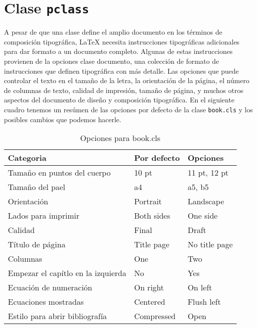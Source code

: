 	

\section{Clase \texttt{pclass}}

	
A pesar de que  una clase  define el amplio documento en los términos de composición tipográfica, \LaTeX{} necesita instrucciones tipográficas adicionales para dar formato a un documento completo. Algunas de estas instrucciones provienen de la opciones clase documento,  una colección de formato de instrucciones que definen tipográfica con más detalle. Las opciones que puede controlar el texto en el tamaño de la letra, la orientación de la página, el número de columnas de texto, calidad de impresión, tamaño de página, y muchos otros aspectos del documento de diseño y composición tipográfica. En el siguiente  cuadro tenemos un resúmen de las opciones por defecto de la clase \verb|book.cls|  y los posibles cambios que podemos hacerle.
		\begin{table}[tbh]
  		 \begin{center}
    		    \leavevmode
		    \begin{tabular}{|l|l||l|}
      		    \hline
			\textbf{Categoria} & \textbf{Por defecto} & \textbf{Opciones} \\
		    \hline
		    \hline
      			Tamaño en puntos del cuerpo & 10 pt  &  11 pt, 12 pt   \\
		    \hline
      			Tamaño del pael  & a4    & a5, b5\\
      		    \hline
      			Orientación & Portrait   &     Landscape     \\
		    \hline
        		Lados para imprimir & Both sides   &      One side   \\
		    \hline
      			Calidad  & Final  & Draft    \\
      		    \hline
			Título de página & Title page   & No title page      \\
		    \hline
      			Columnas & One  &   Two      \\
      		    \hline
		        Empezar el capítlo en la izquierda & No & Yes   \\
		    \hline
	                Ecuación de numeración & On right   & On left   \\
		    \hline
		        Ecuaciones mostradas & Centered  &  Flush left \\
		    \hline
			Estilo para abrir bibliografía & Compressed & Open\\
		    \hline
    		    \end{tabular}
  		\end{center}
  		  \caption{Opciones para book.cls}
	 	  \label{tab:bookoption}
	       \end{table}

